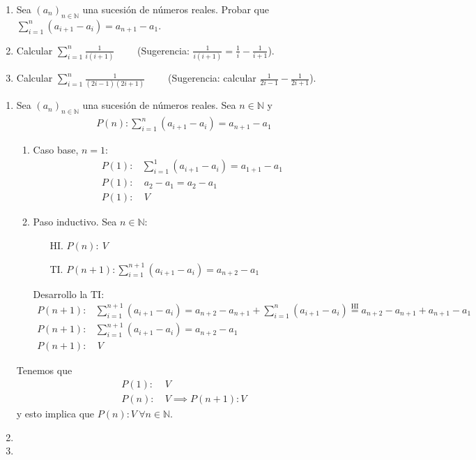 \ejercicio
\begin{enumerate}[label=\roman*)]
\item Sea $(a_n)_{n \in \mathbb{N}}$ una sucesión de números reales. Probar que $\displaystyle \sum^{n}_{i=1}(a_{i+1} - a_{i}) = a_{n+1} - a_{1}$.
\item Calcular $\displaystyle \sum^{n}_{i=1} \frac{1}{i(i+1)}$ \ \ \ \ (Sugerencia: $\displaystyle \frac{1}{i(i+1)} = \frac{1}{i} - \frac{1}{i+1}$).
\item Calcular $\displaystyle \sum^{n}_{i=1}\frac{1}{(2i-1)(2i+1)}$ \ \ \ \ (Sugerencia: calcular $\displaystyle \frac{1}{2i-1} - \frac{1}{2i+1}$).
\end{enumerate}
\begin{enumerate}[label=\roman*)]
\item Sea $(a_n)_{n \in \mathbb{N}}$ una sucesión de números reales. Sea $n \in \mathbb{N}$ y
\begin{align*}
P(n): \sum^{n}_{i=1}(a_{i+1} - a_{i}) = a_{n+1} - a_{1}
\end{align*}
\begin{enumerate}[label=\arabic*)]
\item Caso base, $ n = 1$:
\begin{align*}
P(1):& \sum^{1}_{i=1}(a_{i+1} - a_{i}) = a_{1+1} - a_{1} \\
P(1):& \ a_{2} - a_{1} = a_{2} - a_{1} \\
P(1):& \ V
\end{align*}
\item Paso inductivo. Sea $n \in \mathbb{N}$:
\begin{enumerate}
\item[HI.] $P(n): \ V$
\item[TI.] $ P(n+1): \displaystyle \sum^{n+1}_{i=1}(a_{i+1} - a_{i}) = a_{n+2} - a_{1} $
\end{enumerate}
Desarrollo la TI:
\begin{align*}
P(n+1):& \sum^{n+1}_{i=1}(a_{i+1} - a_{i}) = a_{n+2} - a_{n+1} + \sum^{n}_{i=1}(a_{i+1} - a_{i}) \overset{\mathrm{HI}}{=} a_{n+2} - a_{n+1} + a_{n+1} - a_{1} \\
P(n+1):& \sum^{n+1}_{i=1}(a_{i+1} - a_{i}) = a_{n+2} - a_{1} \\
P(n+1):& \ V
\end{align*}
\end{enumerate}
Tenemos que
\begin{align*}
P(1):& \ V \\
P(n):& \ V \implies P(n+1):V
\end{align*}
y esto implica que $P(n): V \ \forall n \in \mathbb{N}$.
\item \hacer
\item \hacer
\end{enumerate}